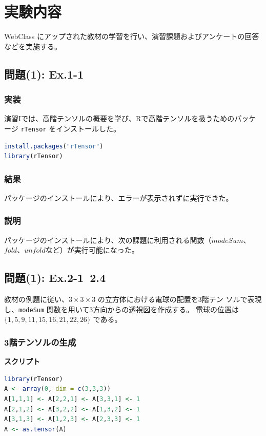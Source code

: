 \documentclass[12pt,a4paper]{ltjsarticle}
\begin{document}
\section{実験内容}\label{sec:content}
WebClass にアップされた教材の学習を行い、演習課題およびアンケートの回答などを実施する。


\subsection{問題(1): Ex.1-1}\label{subsec:exercise1}
\subsubsection{実装}

演習Iでは、高階テンソルの概要を学び、Rで高階テンソルを扱うためのパッケージ
\texttt{rTensor} をインストールした。

\begin{lstlisting}[language=R]
install.packages("rTensor")
library(rTensor)
\end{lstlisting}

\subsubsection{結果}
パッケージのインストールにより、エラーが表示されずに実行できた。

\subsubsection{説明}
パッケージのインストールにより、次の課題に利用される関数（$modeSum$、$fold$、$unfold$など）が実行可能になった。

\subsection{問題(1): Ex.2-1~2.4}\label{subsec:exercise2}

教材の例題に従い、$3 \times 3 \times 3$ の立方体における電球の配置を3階テン
ソルで表現し、\texttt{modeSum} 関数を用いて3方向からの透視図を作成する。
電球の位置は $\{1,5,9,11,15,16,21,22,26\}$ である。
\newpage
\subsubsection{3階テンソルの生成}

\textbf{スクリプト}

\begin{lstlisting}[language=R]
library(rTensor)
A <- array(0, dim = c(3,3,3))
A[1,1,1] <- A[2,2,1] <- A[3,3,1] <- 1
A[2,1,2] <- A[3,2,2] <- A[1,3,2] <- 1
A[3,1,3] <- A[1,2,3] <- A[2,3,3] <- 1
A <- as.tensor(A)
\end{lstlisting}
\end{document}
